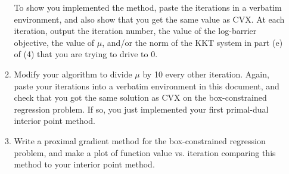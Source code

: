 \documentclass[12pt]{amsart}
\begin{document}
\begin{enumerate}
\begin{enumerate}
To show you implemented the method, paste the iterations in a verbatim environment, and also show that you get the same value 
as CVX. At each iteration, output the iteration number, the value of the log-barrier objective, the value of $\mu$, 
and/or the norm of the KKT system in part (e) of (4) that you are trying to drive to 0.
\\

\item Modify your algorithm to divide $\mu$ by 10 every other iteration. Again, paste your iterations 
into a verbatim environment in this document, and check that you got the same solution as CVX 
on the box-constrained regression problem. If so, you just implemented your first primal-dual interior point method. 
\\

\item Write a proximal gradient method for the box-constrained regression problem, and make a plot of function value 
vs. iteration comparing this method to your interior point method. 


\end{enumerate}





\end{enumerate}
\end{document}
